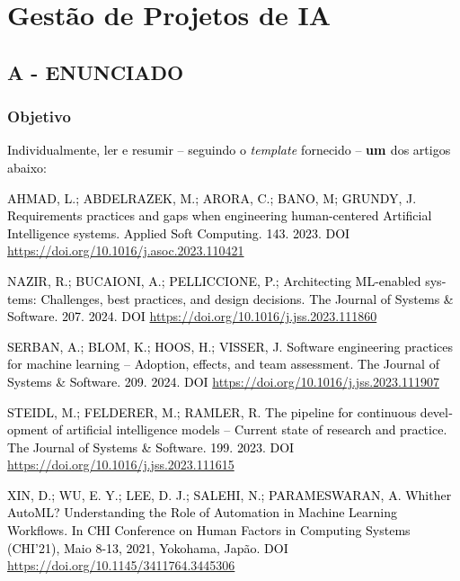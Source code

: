 \label{ap:ap12}
\chapter{Gestão de Projetos de IA}
\section*{\textbf{A - ENUNCIADO}}

\subsection{Objetivo}

\textcolor{black}{Individualmente, ler e resumir – seguindo o }\textit{\textcolor{black}{template }}\textcolor{black}{
fornecido – }\textbf{\textcolor{black}{um }}\textcolor{black}{ dos artigos abaixo:}



\foreignlanguage{english}{\textcolor{black}{AHMAD, L.; ABDELRAZEK, M.; ARORA, C.; BANO, M; GRUNDY, J. Requirements
practices and gaps when engineering human-centered Artificial Intelligence systems. Applied Soft Computing. 143. 2023.
DOI }}\url{https://doi.org/10.1016/j.asoc.2023.110421}

\foreignlanguage{english}{\textcolor{black}{NAZIR, R.; BUCAIONI, A.; PELLICCIONE, P.; Architecting ML-enabled systems:
Challenges, best practices, and design decisions. The Journal of Systems \& Software. 207. 2024. DOI
}}\url{https://doi.org/10.1016/j.jss.2023.111860}\foreignlanguage{english}{\textcolor{black}{ }}

\foreignlanguage{english}{\textcolor{black}{SERBAN, A.; BLOM, K.; HOOS, H.; VISSER, J. Software engineering practices
for machine learning – Adoption, effects, and team assessment. The Journal of Systems \& Software. 209. 2024. DOI
}}\url{https://doi.org/10.1016/j.jss.2023.111907}\foreignlanguage{english}{\textcolor{black}{ }}

\foreignlanguage{english}{\textcolor{black}{STEIDL, M.; FELDERER, M.; RAMLER, R. The pipeline for continuous development
of artificial intelligence models – Current state of research and practice. The Journal of Systems \& Software. 199.
2023. DOI }}\url{https://doi.org/10.1016/j.jss.2023.111615}\foreignlanguage{english}{\textcolor{black}{ }}

\foreignlanguage{english}{\textcolor{black}{XIN, D.; WU, E. Y.; LEE, D. J.; SALEHI, N.; PARAMESWARAN, A. Whither AutoML?
Understanding the Role of Automation in Machine Learning Workflows. In CHI Conference on Human Factors in Computing
Systems (CHI'21), Maio 8-13, 2021, Yokohama, Japão. }}\textcolor{black}{DOI
}\url{https://doi.org/10.1145/3411764.3445306}\textcolor{black}{ }



